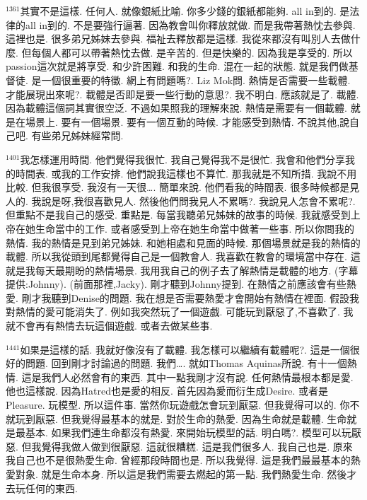 \documentclass{book}
\begin{document}
$^{1361}$其實不是這樣.
任何人.
就像銀紙比喻.
你多少錢的銀紙都能夠.
all in到的.
是法律的all in到的.
不是要強行逼著.
因為教會叫你釋放就做.
而是我帶著熱忱去參與.
這裡也是.
很多弟兄姊妹去參與.
福祉去釋放都是這樣.
我從來都沒有叫別人去做什麼.
但每個人都可以帶著熱忱去做.
是辛苦的.
但是快樂的.
因為我是享受的.
所以passion這次就是將享受.
和少許困難.
和我的生命.
混在一起的狀態.
就是我們做基督徒.
是一個很重要的特徵.
網上有問題嗎?.
Liz Mok問.
熱情是否需要一些載體.
才能展現出來呢?.
載體是否即是要一些行動的意思?.
我不明白.
應該就是了.
載體.
因為載體這個詞其實很空泛.
不過如果照我的理解來說.
熱情是需要有一個載體.
就是在場景上.
要有一個場景.
要有一個互動的時候.
才能感受到熱情.
不說其他,說自己吧.
有些弟兄姊妹經常問.

$^{1401}$我怎樣運用時間.
他們覺得我很忙.
我自己覺得我不是很忙.
我會和他們分享我的時間表.
或我的工作安排.
他們說我這樣也不算忙.
那我就是不知所措.
我說不用比較.
但我很享受.
我沒有一天很….
簡單來說.
他們看我的時間表.
很多時候都是見人的.
我說是呀,我很喜歡見人.
然後他們問我見人不累嗎?.
我說見人怎會不累呢?.
但重點不是我自己的感受.
重點是.
每當我聽弟兄姊妹的故事的時候.
我就感受到上帝在她生命當中的工作.
或者感受到上帝在她生命當中做著一些事.
所以你問我的熱情.
我的熱情是見到弟兄姊妹.
和她相處和見面的時候.
那個場景就是我的熱情的載體.
所以我從頭到尾都覺得自己是一個教會人.
我喜歡在教會的環境當中存在.
這就是我每天最期盼的熱情場景.
我用我自己的例子去了解熱情是載體的地方.
(字幕提供:Johnny).
(前面那裡,Jacky).
剛才聽到Johnny提到.
在熱情之前應該會有些熱愛.
剛才我聽到Denise的問題.
我在想是否需要熱愛才會開始有熱情在裡面.
假設我對熱情的愛可能消失了.
例如我突然玩了一個遊戲.
可能玩到厭惡了,不喜歡了.
我就不會再有熱情去玩這個遊戲.
或者去做某些事.

$^{1441}$如果是這樣的話.
我就好像沒有了載體.
我怎樣可以繼續有載體呢?.
這是一個很好的問題.
回到剛才討論過的問題.
我們….
就如Thomas Aquinas所說.
有十一個熱情.
這是我們人必然會有的東西.
其中一點我剛才沒有說.
任何熱情最根本都是愛.
他也這樣說.
因為Hatred也是愛的相反.
首先因為愛而衍生成Desire.
或者是Pleasure.
玩模型.
所以這件事.
當然你玩遊戲怎會玩到厭惡.
但我覺得可以的.
你不就玩到厭惡.
但我覺得最基本的就是.
對於生命的熱愛.
因為生命就是載體.
生命就是最基本.
如果我們連生命都沒有熱愛.
來開始玩模型的話.
明白嗎?.
模型可以玩厭惡.
但我覺得我做人做到很厭惡.
這就很糟糕.
這是我們很多人.
我自己也是.
原來我自己也不是很熱愛生命.
曾經那段時間也是.
所以我覺得.
這是我們最最基本的熱愛對象.
就是生命本身.
所以這是我們需要去燃起的第一點.
我們熱愛生命.
然後才去玩任何的東西.
\end{document}
